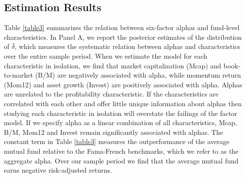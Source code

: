 \subsection{Estimation Results}
\label{estimation_results}
Table \ref{table3} summarizes the relation between six-factor alphas and fund-level characteristics. In Panel A, we report the posterior estimates of the distribution of $\bar{\delta}$, which measures the systematic relation between alphas and characteristics over the entire sample period. When we estimate the model for each characteristic in isolation, we find that market capitalization (Mcap) and book-to-market (B/M) are negatively associated with alpha, while momentum return (Mom12) and asset growth (Invest) are positively associated with alpha. Alphas are unrelated to the profitability characteristic. If the characteristics are correlated with each other and offer little unique information about alphas then studying each characteristic in isolation will overstate the failings of the factor model. If we specify alpha as a linear combination of all characteristics, Mcap, B/M, Mom12 and Invest remain significantly associated with alphas. The constant term in Table \ref{table3} measures the outperformance of the average mutual fund relative to the Fama-French benchmarks, which we refer to as the aggregate alpha. Over our sample period we find that the average mutual fund earns negative risk-adjusted returns. 


